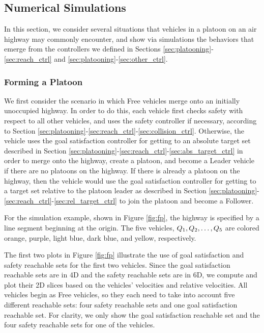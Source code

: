 \subsection{Numerical Simulations}
In this section, we consider several situations that vehicles in a platoon on an air highway may commonly encounter, and show via simulations the behaviors that emerge from the controllers we defined in Sections \ref{sec:platooning}-\ref{sec:reach_ctrl} and \ref{sec:platooning}-\ref{sec:other_ctrl}.

\subsubsection{Forming a Platoon}
We first consider the scenario in which Free vehicles merge onto an initially unoccupied highway. In order to do this, each vehicle first checks safety with respect to all other vehicles, and uses the safety controller if necessary, according to Section \ref{sec:platooning}-\ref{sec:reach_ctrl}-\ref{sec:collision_ctrl}. Otherwise, the vehicle uses the goal satisfaction controller for getting to an absolute target set described in Section \ref{sec:platooning}-\ref{sec:reach_ctrl}-\ref{sec:abs_target_ctrl} in order to merge onto the highway, create a platoon, and become a Leader vehicle if there are no platoons on the highway. If there is already a platoon on the highway, then the vehicle would use the goal satisfaction controller for getting to a target set relative to the platoon leader as described in Section \ref{sec:platooning}-\ref{sec:reach_ctrl}-\ref{sec:rel_target_ctrl} to join the platoon and become a Follower.

For the simulation example, shown in Figure \ref{fig:fp}, the highway is specified by a line segment beginning at the origin. The five vehicles, $Q_{1}, Q_{2}, \ldots, Q_{5}$ are colored orange, purple, light blue, dark blue, and yellow, respectively.

The first two plots in Figure \ref{fig:fp} illustrate the use of goal satisfaction and safety reachable sets for the first two vehicles. Since the goal satisfaction reachable sets are in 4D and the safety reachable sets are in 6D, we compute and plot their 2D slices based on the vehicles' velocities and relative velocities.  All vehicles begin as Free vehicles, so they each need to take into account five different reachable sets: four safety reachable sets and one goal satisfaction reachable set. For clarity, we only show the goal satisfaction reachable set and the four safety reachable sets for one of the vehicles. 

